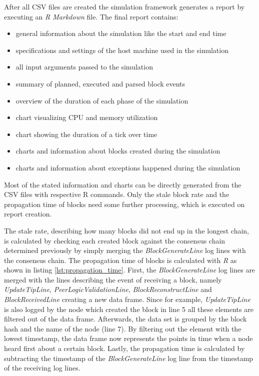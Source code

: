 After all CSV files are created the simulation framework generates a report by executing an \textit{R Markdown} file.
The final report contains:
\begin{itemize}
	\item general information about the simulation like the start and end time
	\item specifications and settings of the host machine used in the simulation
	\item all input arguments passed to the simulation
	\item summary of planned, executed and parsed block events
	\item overview of the duration of each phase of the simulation
	\item chart visualizing CPU and memory utilization
	\item chart showing the duration of a tick over time
	\item charts and information about blocks created during the simulation
	\item charts and information about exceptions happened during the simulation
\end{itemize}

Most of the stated information and charts can be directly generated from the CSV files with respective R commands.
Only the stale block rate and the propagation time of blocks need some further processing, which is executed on report creation.

The stale rate, describing how many blocks did not end up in the longest chain, is calculated by checking each created block against the consensus chain determined previously by simply merging the \textit{BlockGenerateLine} log lines with the consensus chain.
The propagation time of blocks is calculated with \textit{R} as shown in listing \ref{lst:propagation_time}.
First, the \textit{BlockGenerateLine} log lines are merged with the lines describing the event of receiving a block, namely	\textit{UpdateTipLine}, \textit{PeerLogicValidationLine}, \textit{BlockReconstructLine} and \textit{BlockReceivedLine} creating a new data frame.
Since for example, \textit{UpdateTipLine} is also logged by the node which created the block in line 5 all these elements are filtered out of the data frame.
Afterwards, the data set is grouped by the block hash and the name of the node (line 7).
By filtering out the element with the lowest timestamp, the data frame now represents the points in time when a node heard first about a certain block.
Lastly, the propagation time is calculated by subtracting the timestamp of the \textit{BlockGenerateLine} log line from the timestamp of the receiving log lines.

